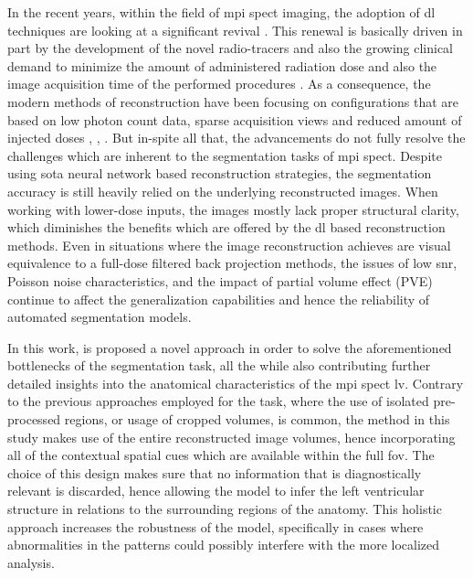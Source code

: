 In the recent years, within the field of \gls{mpi} \gls{spect} imaging, the adoption of \gls{dl} techniques are looking at a significant revival \cite{tolu2025advancements}. This renewal is basically driven in part by the development of the novel radio-tracers and also the growing clinical demand to minimize the amount of administered radiation dose and also the image acquisition time of the performed procedures \cite{henzlova2011future}. As a consequence, the modern methods of reconstruction have been focusing on configurations that are based on low photon count data, sparse acquisition views and reduced amount of injected doses \cite{xie2023transformer}, \cite{xie2024generalizable}, \cite{chen2024dudocfnet}. But in-spite all that, the advancements do not fully resolve the challenges which are inherent to the segmentation tasks of \gls{mpi} \gls{spect}. Despite using \gls{sota} neural network based reconstruction strategies, the segmentation accuracy is still heavily relied on the underlying reconstructed images. When working with lower-dose inputs, the images mostly lack proper structural clarity, which diminishes the benefits which are offered by the \gls{dl} based reconstruction methods. Even in situations where the image reconstruction achieves are visual equivalence to a full-dose filtered back projection methods, the issues of low \gls{snr}, Poisson noise characteristics, and the impact of partial volume effect (PVE) continue to affect the generalization capabilities and hence the reliability of automated segmentation models.

In this work, is proposed a novel approach in order to solve the aforementioned bottlenecks of the segmentation task, all the while also contributing further detailed insights into the anatomical characteristics of the \gls{mpi} \gls{spect} \gls{lv}. Contrary to the previous approaches employed for the task, where the use of isolated pre-processed regions, or usage of cropped volumes, is common, the method in this study makes use of the entire reconstructed image volumes, hence incorporating all of the contextual spatial cues which are available within the full \gls{fov}. The choice of this design makes sure that no information that is diagnostically relevant is discarded, hence allowing the model to infer the left ventricular structure in relations to the surrounding regions of the anatomy. This holistic approach increases the robustness of the model, specifically in cases where abnormalities in the patterns could possibly interfere with the more localized analysis.

